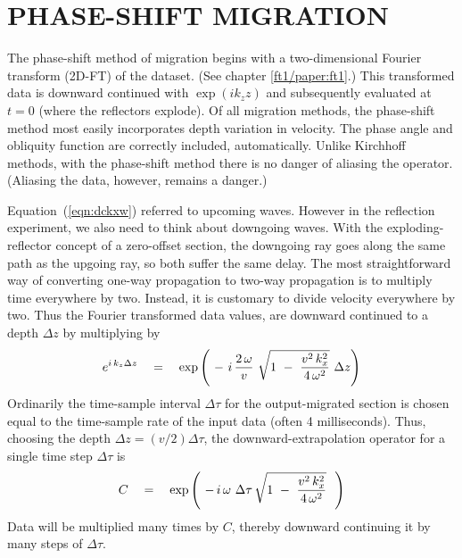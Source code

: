 
\section{PHASE-SHIFT MIGRATION}
The phase-shift method of migration
begins with a two-dimensional Fourier transform (2D-FT) of the dataset.
(See chapter \ref{ft1/paper:ft1}.)
This transformed data is downward continued
with  $\exp(ik_z z)$  and subsequently evaluated
at $t=0$ (where the reflectors explode).
Of all migration methods,
the phase-shift method
most easily incorporates depth variation in velocity.
The phase angle and obliquity function are correctly included,
automatically.
Unlike Kirchhoff methods,
with the phase-shift method there is no danger of aliasing the operator.
(Aliasing the data, however, remains a danger.)

\par
Equation~(\ref{eqn:dckxw}) referred to upcoming waves.
However in the reflection experiment,
we also need to think about downgoing waves.
With the exploding-reflector concept of a zero-offset section,
the downgoing ray goes along the same path as the upgoing ray,
so both suffer the same delay.
The most straightforward way of converting one-way propagation
to two-way propagation is to multiply time everywhere by two.
Instead, it is customary to divide velocity everywhere by two.
Thus the Fourier transformed data values,
are downward continued to a depth $\Delta z$ by multiplying by
\begin{equation}
e^{ i\,k_z \Delta z }
\quad =\quad
\exp \left(  \  - \ i \, {2\,\omega \over v }\ \sqrt{
1 \ -\  { v^2\,k_x^2   \over 4\,\omega^2 } }
\  \Delta z \right)
\label{eqn:3.4}
\end{equation}
Ordinarily the time-sample interval $\Delta \tau$  for the output-migrated
section is chosen equal to the time-sample rate
of the input data (often 4 milliseconds).
Thus, choosing the depth  $ \Delta z = (v/2) \Delta \tau $,
the downward-extrapolation operator for a single time step $\Delta \tau$ is
\begin{equation}
C\quad =\quad
\exp  \left( \  - \,i \, \omega \  \Delta \tau\,\sqrt{
1 \ -\  { v^2\,k_x^2   \over 4\,\omega^2 } }
\ \ \right)
\label{eqn:3.5}
\end{equation}
Data will be multiplied many times by  $C$,  thereby downward
continuing it by many steps of  $\Delta \tau$.

